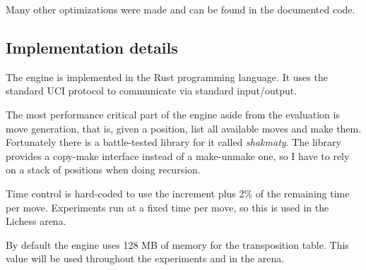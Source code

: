 Many other optimizations were made and can be found in the documented code.


\subsection{Implementation details}


The engine is implemented in the Rust programming language. It uses the standard UCI protocol to communicate via standard input/output.

The most performance critical part of the engine aside from the evaluation is move generation, that is, given a position, list all available moves and make them.
Fortunately there is a battle-tested library for it called \textit{shakmaty}. The library provides a copy-make interface instead of a make-unmake one, so I have to rely on a stack of positions when doing recursion.

Time control is hard-coded to use the increment plus 2\% of the remaining time per move. Experiments run at a fixed time per move, so this is used in the Lichess arena.

By default the engine uses 128 MB of memory for the transposition table. This value will be used throughout the experiments and in the arena.


